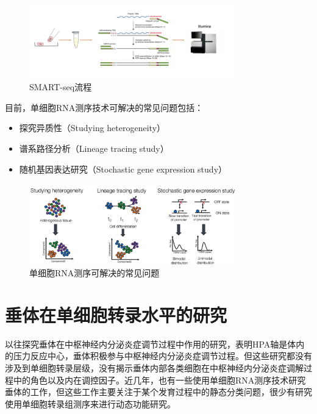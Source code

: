 \begin{figure}[!htb]
  \centering
  \includegraphics[width=0.8\textwidth]{figs/scseq-smart.png}
  \caption{SMART-seq流程}
  \label{fig:scseq-smart}
\end{figure}

  目前，单细胞RNA测序技术可解决的常见问题\cite{liu2016single,junker2014every}包括：
\begin{itemize}
    \item 探究异质性（Studying heterogeneity）
    \item 谱系路径分析（Lineage tracing study）
    \item 随机基因表达研究（Stochastic gene expression study）
\end{itemize}

\begin{figure}[!htb]
  \centering
  \includegraphics[width=0.8\textwidth]{figs/scseq-purpose.png}
  \caption{单细胞RNA测序可解决的常见问题}
  \label{fig:scseq-purpose}
\end{figure}

\section{垂体在单细胞转录水平的研究}
  以往探究垂体在中枢神经内分泌炎症调节过程中作用的研究\cite{chrousos1995hypothalamic,shanks2000early}，表明HPA轴是体内的压力反应中心，垂体积极参与中枢神经内分泌炎症调节过程。但这些研究都没有涉及到单细胞转录层级，没有揭示垂体内部各类细胞在中枢神经内分泌炎症调解过程中的角色以及内在调控因子。近几年，也有一些使用单细胞RNA测序技术研究垂体的工作\cite{chen2020single,cheung2018single,ho2020single,fletcher2019cell}，但这些工作主要关注于某个发育过程中的静态分类问题，很少有研究使用单细胞转录组测序来进行动态功能研究。

